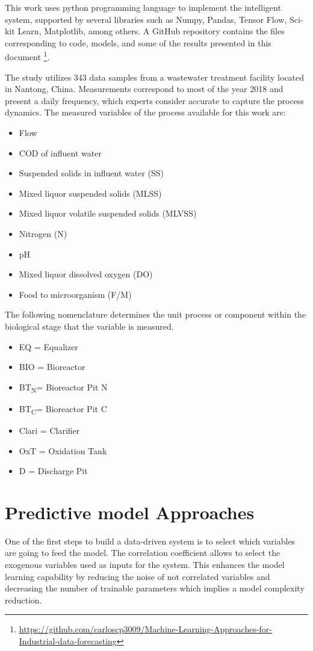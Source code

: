 This work uses python programming language to implement the intelligent system, supported by several libraries such as Numpy, Pandas, Tensor Flow, Sci-kit Learn, Matplotlib, among others. A GitHub repository contains the files corresponding to code, models, and some of the results presented in this document \footnote{\url{https://github.com/carloscp3009/Machine-Learning-Approaches-for-Industrial-data-forecasting}}. 

The study utilizes 343 data samples from a wastewater treatment facility located in Nantong, China. Measurements correspond to most of the year 2018 and present a daily frequency, which experts consider accurate to capture the process dynamics. The measured variables of the process available for this work are:

\begin{itemize}
 \item	Flow
 \item	COD of influent water
 \item	Suspended solids in influent water (SS)
 \item	Mixed liquor suspended solids (MLSS)
 \item	Mixed liquor volatile suspended solids (MLVSS)
 \item	Nitrogen (N)
 \item	pH
 \item	Mixed liquor dissolved oxygen (DO)
 \item	Food to microorganism (F/M)
\end{itemize}

The following nomenclature determines the unit process or component within the biological stage that the variable is measured.

\begin{itemize}
 \item	EQ = Equalizer
 \item	BIO = Bioreactor
 \item	BT\textsubscript{N}= Bioreactor Pit N
 \item	BT\textsubscript{C}= Bioreactor Pit C
 \item	Clari = Clarifier
 \item	OxT = Oxidation Tank
 \item	D = Discharge Pit
\end{itemize}

\section{Predictive model Approaches}
\label{s:model-design}
One of the first steps to build a data-driven system is to select which variables are going to feed the model. The correlation coefficient allows to select the exogenous variables used as inputs for the system. This enhances the model learning capability by reducing the noise of not correlated variables and decreasing the number of trainable parameters which implies a model complexity reduction. 

